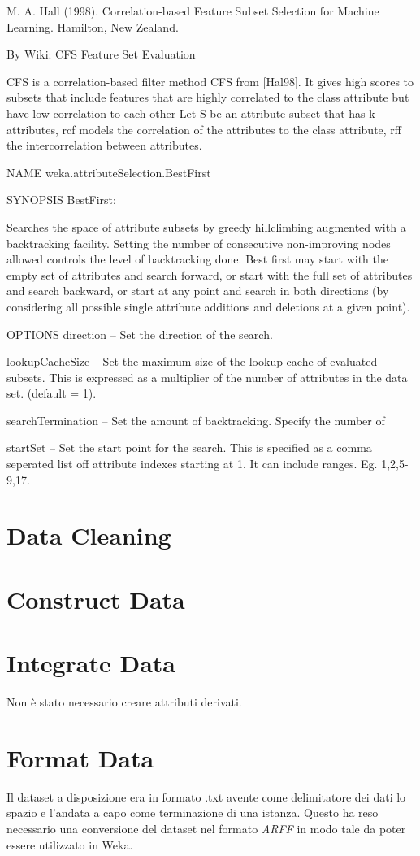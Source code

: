 M. A. Hall (1998). Correlation-based Feature Subset Selection for Machine Learning. Hamilton, New Zealand.


By Wiki:
CFS Feature Set Evaluation

CFS is a correlation-based filter method CFS from [Hal98]. It gives high scores to subsets that include features
that are highly correlated to the class attribute but have low correlation to each other Let S be an attribute
subset that has k attributes, rcf models the correlation of the attributes to the class attribute, rff the
intercorrelation between attributes.


NAME
weka.attributeSelection.BestFirst

SYNOPSIS
BestFirst:

Searches the space of attribute subsets by greedy hillclimbing augmented with a backtracking facility. Setting the number of consecutive non-improving nodes allowed controls the level of backtracking done. Best first may start with the empty set of attributes and search forward, or start with the full set of attributes and search backward, or start at any point and search in both directions (by considering all possible single attribute additions and deletions at a given point).


OPTIONS
direction -- Set the direction of the search.

lookupCacheSize -- Set the maximum size of the lookup cache of evaluated subsets. This is expressed as a multiplier of the number of attributes in the data set. (default = 1).

searchTermination -- Set the amount of backtracking. Specify the number of 

startSet -- Set the start point for the search. This is specified as a comma seperated list off attribute indexes starting at 1. It can include ranges. Eg. 1,2,5-9,17.

\section{Data Cleaning}

\section{Construct Data}

\section{Integrate Data}
Non è stato necessario creare attributi derivati.

\section{Format Data}
Il dataset a disposizione era in formato .txt avente come delimitatore dei dati lo spazio e l'andata a capo come terminazione di una istanza. Questo ha reso necessario una conversione del dataset nel formato \textit{ARFF} in modo tale da poter essere utilizzato in Weka.
